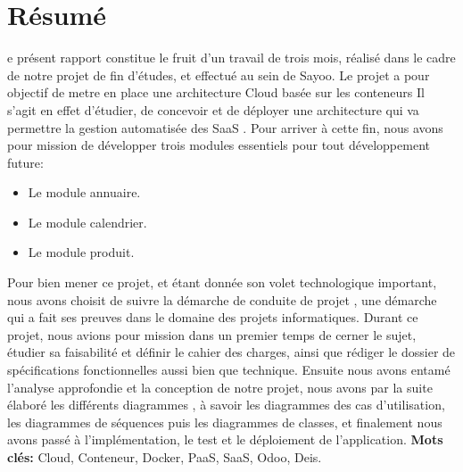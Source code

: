 
\chapter*{Résumé}
\begin{onehalfspace}
e présent rapport constitue le fruit d'un travail de trois mois, réalisé dans le cadre de notre projet de fin d'études, et effectué au sein de Sayoo. Le projet a pour objectif de metre en place une architecture Cloud basée sur les conteneurs
\newline
\newline
Il s'agit en effet d'étudier, de concevoir et de déployer une architecture qui va permettre la gestion automatisée des SaaS . Pour arriver à cette fin, nous avons pour mission de développer trois modules essentiels pour tout développement future:

    \begin{itemize}
        \item Le module annuaire.
        \item Le module calendrier.
        \item Le module produit.
    \end{itemize}

\noindent Pour bien mener ce projet, et étant donnée son volet technologique important, nous avons choisit de suivre la démarche de conduite de projet , une démarche qui a fait ses preuves dans le domaine des projets informatiques.
\newline
\newline
Durant ce projet, nous avions pour mission dans un premier temps de cerner le sujet, étudier sa faisabilité et définir le cahier des charges, ainsi que rédiger le dossier de spécifications fonctionnelles aussi bien que technique. Ensuite nous avons entamé l'analyse approfondie et la conception de notre projet, nous avons par la suite élaboré les différents diagrammes , à savoir les diagrammes des cas d'utilisation, les diagrammes de séquences puis les diagrammes de classes, et finalement nous avons passé à l'implémentation, le test et le déploiement de l'application.
\vfill{\textbf{Mots clés:} Cloud, Conteneur, Docker, PaaS, SaaS, Odoo, Deis.}
\end{onehalfspace}